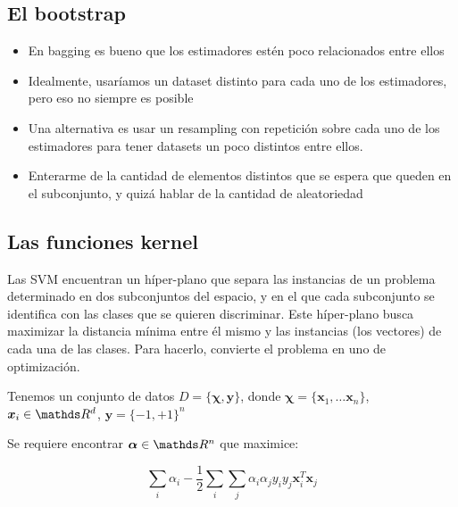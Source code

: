 \subsection{El bootstrap}
\begin{itemize}
 \item En bagging es bueno que los estimadores estén poco relacionados
       entre ellos
 \item Idealmente, usaríamos un dataset distinto para cada uno de los
       estimadores, pero eso no siempre es posible
 \item Una alternativa es usar un resampling con repetición sobre cada
       uno de los estimadores para tener datasets un poco distintos entre ellos.
 \item Enterarme de la cantidad de elementos distintos que se espera que queden
       en el subconjunto, y quizá hablar de la cantidad de aleatoriedad
\end{itemize}
\subsection{Las funciones kernel}
Las SVM encuentran un híper-plano que separa las instancias de un problema
determinado en dos subconjuntos del espacio, y en el que cada subconjunto se
identifica con las clases que se quieren discriminar. Este híper-plano
busca maximizar la distancia mínima entre él mismo y las instancias (los vectores)
de cada una de las clases. Para hacerlo, convierte el problema en uno de
optimización.

Tenemos un conjunto de datos $D = \{\bm{\chi}, \bm{y}\}$, donde $\bm{\chi} = \{\bm{x}_1, \ldots \bm{x}_n\}$, $\bm{x}_i \in \reals^d$, $\bm{y} = \{-1, +1\}^n$

Se requiere encontrar $\bm{\alpha} \in \reals^n$ que maximice:

\begin{equation}
 \sum_i\alpha_i - \frac{1}{2}\sum_i\sum_j\alpha_i\alpha_jy_iy_j\bm{x}_i^T\bm{x}_j
\end{equation}

%

